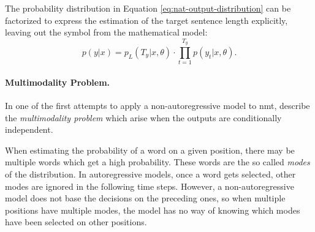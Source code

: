 The probability distribution in Equation \ref{eq:nat-output-distribution} can
be factorized to express the estimation of the target sentence length
explicitly, leaving out the \eos{} symbol from the mathematical model:
\begin{equation}
  p(y|x) = p_L(T_y|x, \theta) \cdot \prod_{t=1}^{T_y}p(y_t|x,\theta).
  \label{eq:explicit-length}
\end{equation}




\citep{ghazvininejad2019mask} \citep{mansimov2019generalized}

\paragraph{Multimodality Problem.} In one of the first attempts to apply a
non-autoregressive model to \gls{nmt}, \citet{gu2017nonautoregressive} describe
the \emph{multimodality problem} which arise when the outputs are conditionally
independent.

When estimating the probability of a word on a given position, there may be
multiple words which get a high probability. These words are the so called
\emph{modes} of the distribution. In autoregressive models, once a word gets
selected, other modes are ignored in the following time steps. However, a
non-autoregressive model does not base the decisions on the preceding ones, so
when multiple positions have multiple modes, the model has no way of knowing
which modes have been selected on other positions.

